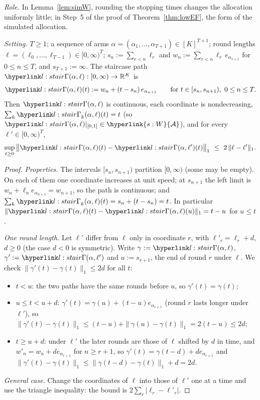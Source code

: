 \documentclass[11pt]{article}
\newcommand{\dt}[1]{\hypertarget{#1}{}}
\DeclareRobustCommand{\sy}[2]{{\hyperlink{#1}{#2}}}
\newcommand{\R}{\mathbb{R}}
\newcommand{\1}{\mathbf{1}}
\newcommand{\Al}{\sy{s:W}{\mathcal A}}
\begin{document}
\begin{lemma}\label{lem:staircase}\dt{l:stair}
\textit{Role.} In Lemma~\ref{lem:simW}, rounding the stopping times changes the allocation uniformly little; in Step~5 of the proof of Theorem~\ref{thm:lowEF}, the
form of the simulated allocation.

\noindent\textit{Setting.} $T\ge1$; a sequence of arms $\alpha=(\alpha_1,\dots,\alpha_{T+1})\in[K]^{T+1}$; round lengths $\ell=(\ell_0,\dots,\ell_{T-1})\in[0,\infty)^T$;
$s_n:=\sum_{r<n}\ell_r$ and $w_n:=\sum_{r<n}\ell_r\,e_{\alpha_{r+1}}$ for $0\le n\le T$, and $s_{T+1}:=\infty$. The staircase path $\lGam(\alpha,\ell):[0,\infty)\to\R^K$ is
\[
\lGam(\alpha,\ell)(t):=w_n+(t-s_n)\,e_{\alpha_{n+1}}\qquad\text{for }t\in[s_n,s_{n+1}),\ 0\le n\le T .
\]
\noindent Then $\lGam(\alpha,\ell)$ is continuous, each coordinate is nondecreasing, $\sum_k\lGam_k(\alpha,\ell)(t)=t$ (so $\lGam(\alpha,\ell)|_{[0,1]}\in\Al$), and for every
$\ell'\in[0,\infty)^T$,
\[
\sup_{t\ge0}\big\|\lGam(\alpha,\ell)(t)-\lGam(\alpha,\ell')(t)\big\|_1\ \le\ 2\,\|\ell-\ell'\|_1 .
\]
\end{lemma}
\begin{proof}
\textit{Properties.} The intervals $[s_n,s_{n+1})$ partition $[0,\infty)$ (some may be empty). On each of them one coordinate increases at unit speed; at $s_{n+1}$ the left
limit is $w_n+\ell_ne_{\alpha_{n+1}}=w_{n+1}$, so the path is continuous; and $\sum_k\lGam_k(\alpha,\ell)(t)=s_n+(t-s_n)=t$. In particular $\|\lGam(\alpha,\ell)(t)-\lGam(\alpha,\ell)(u)\|_1=t-u$
for $u\le t$.

\textit{One round length.} Let $\ell'$ differ from $\ell$ only in coordinate $r$, with $\ell'_r=\ell_r+d$, $d\ge0$ (the case $d<0$ is symmetric). Write $\gamma:=\lGam(\alpha,\ell)$,
$\gamma':=\lGam(\alpha,\ell')$ and $u:=s_{r+1}$, the end of round $r$ under $\ell$. We check $\|\gamma'(t)-\gamma(t)\|_1\le2d$ for all $t$:
\begin{itemize}
\item $t<u$: the two paths have the same rounds before $u$, so $\gamma'(t)=\gamma(t)$;
\item $u\le t<u+d$: $\gamma'(t)=\gamma(u)+(t-u)e_{\alpha_{r+1}}$ (round $r$ lasts longer under $\ell'$), so
$\|\gamma'(t)-\gamma(t)\|_1\le(t-u)+\|\gamma(u)-\gamma(t)\|_1=2(t-u)\le2d$;
\item $t\ge u+d$: under $\ell'$ the later rounds are those of $\ell$ shifted by $d$ in time, and $w'_n=w_n+de_{\alpha_{r+1}}$ for $n\ge r+1$, so $\gamma'(t)=\gamma(t-d)+de_{\alpha_{r+1}}$
and $\|\gamma'(t)-\gamma(t)\|_1\le\|\gamma(t-d)-\gamma(t)\|_1+d=2d$.
\end{itemize}
\textit{General case.} Change the coordinates of $\ell$ into those of $\ell'$ one at a time and use the triangle inequality: the bound is $2\sum_r|\ell_r-\ell'_r|$.
\end{proof}
\end{document}
